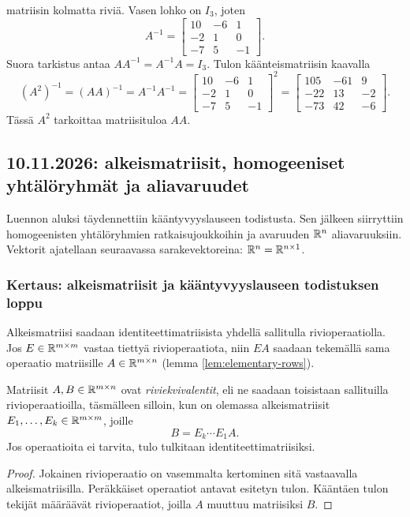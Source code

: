 \documentclass[11pt,a4paper]{amsart}
\begin{document}
\begin{example}
    matriisin kolmatta riviä. Vasen lohko on $I_3$, joten
    \[
      \boxed{A^{-1}=
        \begin{bmatrix}10&-6&1\\-2&1&0\\-7&5&-1
      \end{bmatrix}.}
    \]
    Suora tarkistus antaa $AA^{-1}=A^{-1}A=I_3$.
    Tulon käänteismatriisin kaavalla
    \[
      (A^2)^{-1}=(AA)^{-1}=A^{-1}A^{-1}
      =
      \begin{bmatrix}10&-6&1\\-2&1&0\\-7&5&-1
      \end{bmatrix}^{\!2}
      =\boxed{
        \begin{bmatrix}105&-61&9\\-22&13&-2\\-73&42&-6
      \end{bmatrix}.}
    \]
    Tässä $A^2$ tarkoittaa matriisituloa $AA$.
  \end{example}

  \subsection{10.11.2026: alkeismatriisit, homogeeniset yhtälöryhmät
  ja aliavaruudet}

  Luennon aluksi täydennettiin kääntyvyyslauseen todistusta.
  Sen jälkeen siirryttiin homogeenisten yhtälöryhmien ratkaisujoukkoihin
  ja avaruuden $\mathbb{R}^n$ aliavaruuksiin. Vektorit ajatellaan seuraavassa
  sarakevektoreina: $\mathbb{R}^n=\mathbb{R}^{n\times1}$.

  \subsubsection*{Kertaus: alkeismatriisit ja kääntyvyyslauseen
  todistuksen loppu}

  Alkeismatriisi saadaan identiteettimatriisista yhdellä sallitulla
  rivioperaatiolla. Jos $E\in\mathbb{R}^{m\times m}$ vastaa tiettyä
  rivioperaatiota, niin $EA$ saadaan tekemällä sama operaatio
  matriisille $A\in\mathbb{R}^{m\times n}$
  (lemma \ref{lem:elementary-rows}).

  \begin{corollary}
    Matriisit $A,B\in\mathbb{R}^{m\times n}$ ovat \emph{riviekvivalentit},
    eli ne saadaan toisistaan sallituilla rivioperaatioilla,
    täsmälleen silloin, kun on olemassa alkeismatriisit
    $E_1,\ldots,E_k\in\mathbb{R}^{m\times m}$, joille
    \[
      B=E_k\cdots E_1A.
    \]
    Jos operaatioita ei tarvita, tulo tulkitaan identiteettimatriisiksi.
  \end{corollary}
  \begin{proof}
    Jokainen rivioperaatio on vasemmalta kertominen sitä vastaavalla
    alkeismatriisilla. Peräkkäiset operaatiot antavat esitetyn tulon.
    Kääntäen tulon tekijät määräävät rivioperaatiot, joilla $A$
    muuttuu matriisiksi $B$.
  \end{proof}
\end{document}
